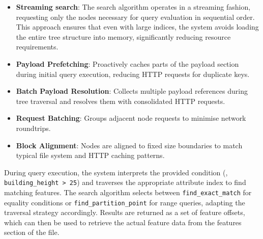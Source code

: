 \begin{itemize}
\item \textbf{Streaming search}: The search algorithm operates in a streaming fashion, requesting only the nodes necessary for query evaluation in sequential order. This approach ensures that even with large indices, the system avoids loading the entire tree structure into memory, significantly reducing resource requirements.
\item \textbf{Payload Prefetching}: Proactively caches parts of the payload section during initial query execution, reducing HTTP requests for duplicate keys.
\item \textbf{Batch Payload Resolution}: Collects multiple payload references during tree traversal and resolves them with consolidated HTTP requests.
\item \textbf{Request Batching}: Groups adjacent node requests to minimise network roundtrips.
\item \textbf{Block Alignment}: Nodes are aligned to fixed size boundaries to match typical file system and HTTP caching patterns.
\end{itemize}

During query execution, the system interprets the provided condition (\eg, \texttt{building\_height > 25}) and traverses the appropriate attribute index to find matching features. The search algorithm selects between \texttt{find\_exact\_match} for equality conditions or \texttt{find\_partition\_point} for range queries, adapting the traversal strategy accordingly. Results are returned as a set of feature offsets, which can then be used to retrieve the actual feature data from the features section of the file.
